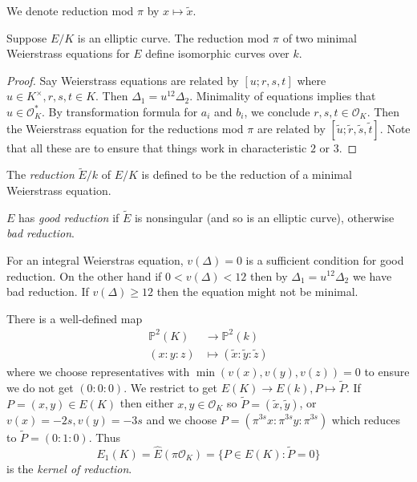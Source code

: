 \documentclass[a4paper]{article}
\theoremstyle{definition}
\theoremstyle{theorem}
\renewcommand*{\P}{\mathbb{P}}
\renewcommand*{\O}{\mathcal{O}}
\begin{document}
\begin{notation}
  We denote reduction mod \(\pi\) by \(x \mapsto \tilde x\).
\end{notation}

\begin{proposition}
  Suppose \(E/K\) is an elliptic curve. The reduction mod \(\pi\) of two minimal Weierstrass equations for \(E\) define isomorphic curves over \(k\).
\end{proposition}

\begin{proof}
  Say Weierstrass equations are related by \([u; r, s, t]\) where \(u \in K^\times, r, s, t \in K\). Then \(\Delta_1 = u^{12} \Delta_2\). Minimality of equations implies that \(u \in \O_K^*\). By transformation formula for \(a_i\) and \(b_i\), we conclude \(r, s, t \in \O_K\). Then the Weierstrass equation for the reductions mod \(\pi\) are related by \([\tilde u; \tilde r, \tilde s, \tilde t]\). Note that all these are to ensure that things work in characteristic \(2\) or \(3\).
\end{proof}

\begin{definition}[reduction]
  The \emph{reduction} \(\widetilde E/k\) of \(E/K\) is defined to be the reduction of a minimal Weierstrass equation.

  \(E\) has \emph{good reduction} if \(\widetilde E\) is nonsingular (and so is an elliptic curve), otherwise \emph{bad reduction}.
\end{definition}

For an integral Weierstras equation, \(v(\Delta) = 0\) is a sufficient condition for good reduction. On the other hand if \(0 < v(\Delta) < 12\) then by \(\Delta_1 = u^{12} \Delta_2\) we have bad reduction. If \(v(\Delta) \geq 12\) then the equation might not be minimal.

There is a well-defined map
\begin{align*}
  \P^2(K) &\to \P^2(k) \\
  (x:y:z) &\mapsto (\tilde x: \tilde y: \tilde z)
\end{align*}
where we choose representatives with \(\min(v(x), v(y), v(z)) = 0\) to ensure we do not get \((0: 0: 0)\). We restrict to get \(E(K) \to E(k), P \mapsto \widetilde P\). If \(P = (x, y) \in E(K)\) then either \(x, y \in \O_K\) so \(\widetilde P = (\tilde x, \tilde y)\), or \(v(x) = -2s, v(y) = -3s\) and we choose \(P = (\pi^{3s} x: \pi^{3s}y: \pi^{3s})\) which reduces to \(\widetilde P = (0: 1: 0)\). Thus
\[
  E_1(K) = \hat E(\pi \O_K) = \{P \in E(K): \widetilde P = 0\}
\]
is the \emph{kernel of reduction}.
\end{document}
